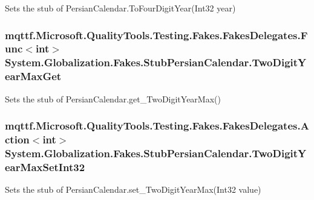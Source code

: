 Sets the stub of Persian\-Calendar.\-To\-Four\-Digit\-Year(\-Int32 year)

\hypertarget{class_system_1_1_globalization_1_1_fakes_1_1_stub_persian_calendar_adca0ea940f3a9157014cf66099d4a205}{
\subsubsection[{Two\-Digit\-Year\-Max\-Get}]{\setlength{\rightskip}{0pt plus 5cm}mqttf.\-Microsoft.\-Quality\-Tools.\-Testing.\-Fakes.\-Fakes\-Delegates.\-Func$<$int$>$ System.\-Globalization.\-Fakes.\-Stub\-Persian\-Calendar.\-Two\-Digit\-Year\-Max\-Get}}\label{class_system_1_1_globalization_1_1_fakes_1_1_stub_persian_calendar_adca0ea940f3a9157014cf66099d4a205}


Sets the stub of Persian\-Calendar.\-get\-\_\-\-Two\-Digit\-Year\-Max()

\hypertarget{class_system_1_1_globalization_1_1_fakes_1_1_stub_persian_calendar_a8f5f7a66582a76c82265ff5c66c70cd7}{
\subsubsection[{Two\-Digit\-Year\-Max\-Set\-Int32}]{\setlength{\rightskip}{0pt plus 5cm}mqttf.\-Microsoft.\-Quality\-Tools.\-Testing.\-Fakes.\-Fakes\-Delegates.\-Action$<$int$>$ System.\-Globalization.\-Fakes.\-Stub\-Persian\-Calendar.\-Two\-Digit\-Year\-Max\-Set\-Int32}}\label{class_system_1_1_globalization_1_1_fakes_1_1_stub_persian_calendar_a8f5f7a66582a76c82265ff5c66c70cd7}


Sets the stub of Persian\-Calendar.\-set\-\_\-\-Two\-Digit\-Year\-Max(\-Int32 value)



